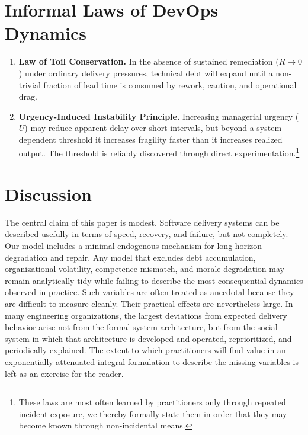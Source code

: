 \documentclass[letterpaper]{article}
\begin{document}
\section{Informal Laws of DevOps Dynamics}

\begin{enumerate}
    \item \textbf{Law of Toil Conservation.} In the absence of sustained remediation ($R \to 0$) under ordinary delivery pressures, technical debt will expand until a non-trivial fraction of lead time is consumed by rework, caution, and operational drag.
    
    \item \textbf{Urgency-Induced Instability Principle.} Increasing managerial urgency ($U$) may reduce apparent delay over short intervals, but beyond a system-dependent threshold it increases fragility faster than it increases realized output. The threshold is reliably discovered through direct experimentation.\footnote{These laws are most often learned by practitioners only through repeated incident exposure, we thereby formally state them in order that they may become known through non-incidental means.}
\end{enumerate}

\section{Discussion}

The central claim of this paper is modest. Software delivery systems can be described usefully in terms of speed, recovery, and failure, but not completely. Our model includes a minimal endogenous mechanism for long-horizon degradation and repair. Any model that excludes debt accumulation, organizational volatility, competence mismatch, and morale degradation may remain analytically tidy while failing to describe the most consequential dynamics observed in practice.  Such variables are often treated as anecdotal because they are difficult to measure cleanly. Their practical effects are nevertheless large. In many engineering organizations, the largest deviations from expected delivery behavior arise not from the formal system architecture, but from the social system in which that architecture is developed and operated, reprioritized, and periodically explained. The extent to which practitioners will find value in an exponentially-attenuated integral formulation to describe the missing variables is left as an exercise for the reader.
\end{document}
